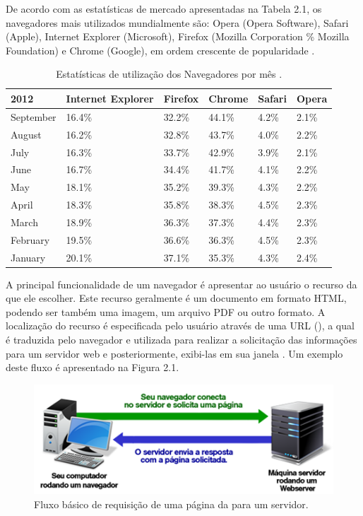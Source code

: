 \documentclass[espaco=simples,appendix=Name]{abnt}
\begin{document}
De acordo com as estatísticas de mercado apresentadas na Tabela 2.1, os navegadores mais utilizados mundialmente são: Opera (Opera Software), Safari (Apple), Internet Explorer (Microsoft), Firefox (Mozilla Corporation \% Mozilla Foundation) e Chrome (Google), em ordem crescente de popularidade \cite{W3schools}.

\begin{table}[ht]
	\centering
	\caption{Estatísticas de utilização dos Navegadores por mês \cite{W3schools}.
	\label{tbl:padc}}{
		\vspace{0.3cm}
		\begin{tabular}{|l|l|l|l|l|l|}
	    	\hline
			\textbf{2012} & \textbf{Internet Explorer} & \textbf{Firefox} &\textbf{Chrome} & \textbf{Safari} & \textbf{Opera} \\
			\hline
			September	& 16.4\% & 32.2\% & 44.1\% & 4.2\% & 2.1\% \\
			\hline
			August		& 16.2\% & 32.8\% & 43.7\% & 4.0\% & 2.2\% \\
			\hline
			July		& 16.3\% & 33.7\% & 42.9\% & 3.9\% & 2.1\% \\
			\hline
			June		& 16.7\% & 34.4\% & 41.7\% & 4.1\% & 2.2\% \\
			\hline
			May			& 18.1\% & 35.2\% & 39.3\% & 4.3\% & 2.2\% \\
			\hline
			April		& 18.3\% & 35.8\% &	38.3\% & 4.5\% & 2.3\% \\
			\hline
			March		& 18.9\% & 36.3\% &	37.3\% & 4.4\% & 2.3\% \\
			\hline
			February	& 19.5\% & 36.6\% &	36.3\% & 4.5\% & 2.3\% \\
			\hline
			January		& 20.1\% & 37.1\% &	35.3\% & 4.3\% & 2.4\% \\
			\hline
		\end{tabular}
		}
\end{table}

A principal funcionalidade de um navegador é apresentar ao usuário o recurso da  que ele escolher. Este  recurso geralmente é um documento em formato HTML, podendo ser também uma imagem, um arquivo PDF ou outro formato. A localização do recurso é especificada pelo usuário através de uma URL (), a qual é traduzida pelo navegador e utilizada para realizar a solicitação das informações para um servidor web e posteriormente, exibi-las em sua janela \cite{ArchitectureWebBrowsers}. Um exemplo deste fluxo é apresentado na Figura 2.1.

\begin{figure}[h]
  \centering
    \includegraphics[scale=1]{web_basic.png}
  \caption{Fluxo básico de requisição de uma página da  para um servidor.}
\end{figure}
 
\end{document}
